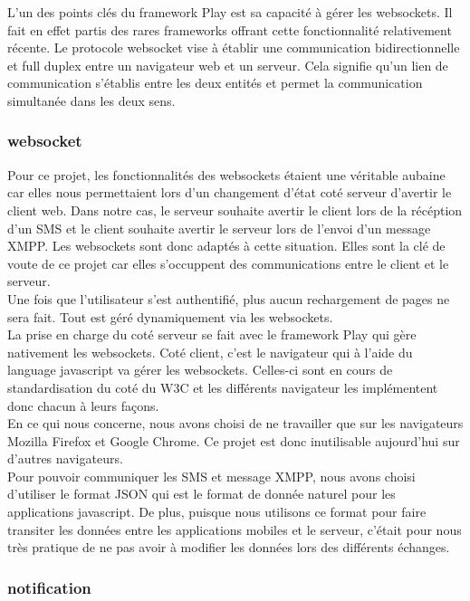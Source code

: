 L'un des points clés du framework Play est sa capacité à gérer les websockets. Il fait en effet partis des rares
frameworks offrant cette fonctionnalité relativement récente. Le protocole websocket vise à établir 
une communication bidirectionnelle et full duplex entre un navigateur web et un serveur. Cela signifie
qu'un lien de communication s'établis entre les deux entités et permet la communication simultanée
dans les deux sens. 

\subsubsection{websocket}

Pour ce projet, les fonctionnalités des websockets étaient une véritable aubaine car elles nous permettaient
lors d'un changement d'état coté serveur d'avertir le client web. Dans notre cas, le serveur souhaite avertir
le client lors de la récéption d'un SMS et le client souhaite avertir le serveur lors de l'envoi d'un message
XMPP. Les websockets sont donc adaptés à cette situation. Elles sont la clé de voute de ce projet car elles 
s'occuppent des communications entre le client et le serveur.
\\
Une fois que l'utilisateur s'est authentifié, plus aucun rechargement de pages ne sera fait. Tout est géré 
dynamiquement via les websockets. 
\\
La prise en charge du coté serveur se fait avec le framework Play qui gère nativement les websockets. Coté client,
c'est le navigateur qui à l'aide du language javascript va gérer les websockets. Celles-ci sont en cours de standardisation
du coté du W3C et les différents navigateur les implémentent donc chacun à leurs façons. 
\\
En ce qui nous concerne, nous avons choisi de ne travailler que sur les navigateurs Mozilla Firefox et Google Chrome.
Ce projet est donc inutilisable aujourd'hui sur d'autres navigateurs.
\\
Pour pouvoir communiquer les SMS et message XMPP, nous avons choisi d'utiliser le format JSON qui est le format de
donnée naturel pour les applications javascript. De plus, puisque nous utilisons ce format pour faire transiter les
données entre les applications mobiles et le serveur, c'était pour nous très pratique de ne pas avoir à modifier
les données lors des différents échanges.

\subsubsection{notification}

